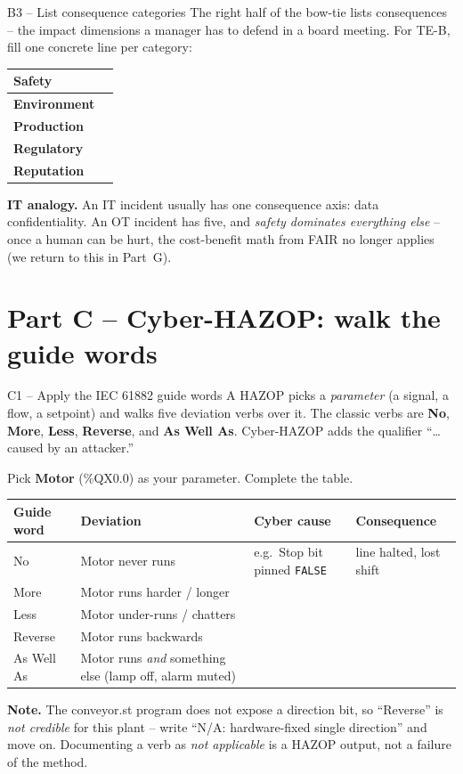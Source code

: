 \documentclass[11pt,a4paper]{article}
\begin{document}
\begin{stepbox}{B3 -- List consequence categories}
The right half of the bow-tie lists consequences -- the impact dimensions a manager has to defend in a board meeting. For TE-B, fill one concrete line per category:

\medskip
\begin{tabular}{|p{30mm}|p{120mm}|}
\hline
\textbf{Safety}        & \\
\hline
\textbf{Environment}   & \\
\hline
\textbf{Production}    & \\
\hline
\textbf{Regulatory}    & \\
\hline
\textbf{Reputation}    & \\
\hline
\end{tabular}

\medskip\noindent
\textbf{IT analogy.} An IT incident usually has one consequence axis: data confidentiality. An OT incident has five, and \emph{safety dominates everything else} -- once a human can be hurt, the cost-benefit math from FAIR no longer applies (we return to this in Part~G).
\end{stepbox}

\section*{Part C -- Cyber-HAZOP: walk the guide words}

\begin{stepbox}{C1 -- Apply the IEC 61882 guide words}
A HAZOP picks a \emph{parameter} (a signal, a flow, a setpoint) and walks five deviation verbs over it. The classic verbs are \textbf{No}, \textbf{More}, \textbf{Less}, \textbf{Reverse}, and \textbf{As Well As}. Cyber-HAZOP adds the qualifier ``\ldots caused by an attacker.''

Pick \textbf{Motor} (\%QX0.0) as your parameter. Complete the table.

\medskip
\renewcommand{\arraystretch}{1.35}
\footnotesize
\begin{tabular}{|p{16mm}|p{32mm}|p{46mm}|p{46mm}|}
\hline
\textbf{Guide word} & \textbf{Deviation} & \textbf{Cyber cause} & \textbf{Consequence} \\
\hline
No          & Motor never runs                & e.g.\ Stop bit pinned \texttt{FALSE} & line halted, lost shift \\
\hline
More        & Motor runs harder / longer      & & \\
\hline
Less        & Motor under-runs / chatters     & & \\
\hline
Reverse     & Motor runs backwards            & & \\
\hline
As Well As  & Motor runs \emph{and} something else (lamp off, alarm muted) & & \\
\hline
\end{tabular}

\medskip\noindent
\textbf{Note.} The conveyor.st program does not expose a direction bit, so ``Reverse'' is \emph{not credible} for this plant -- write ``N/A: hardware-fixed single direction'' and move on. Documenting a verb as \emph{not applicable} is a HAZOP output, not a failure of the method.
\end{stepbox}
\end{document}
